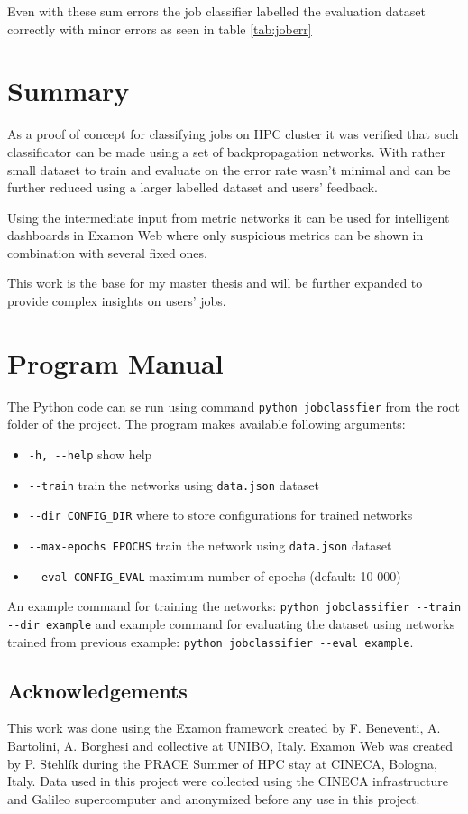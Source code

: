 \documentclass[11pt,a4paper]{article}
\begin{document}
Even with these sum errors the job classifier labelled the evaluation dataset correctly with minor errors as seen in table \ref{tab:joberr}

\section{Summary}
\label{sec:sum}

As a proof of concept for classifying jobs on HPC cluster it was verified that such classificator can be made using a set of backpropagation networks. With rather small dataset to train and evaluate on the error rate wasn't minimal and can be further reduced using a larger labelled dataset and users' feedback.

Using the intermediate input from metric networks it can be used for intelligent dashboards in Examon Web where only suspicious metrics can be shown in combination with several fixed ones.

This work is the base for my master thesis and will be further expanded to provide complex insights on users' jobs.

\section{Program Manual}

The Python code can se run using command \texttt{python jobclassfier} from the root folder of the project. The program makes available following arguments:
\begin{itemize}
    \item \texttt{-h, -{}-help} show help
    \item \texttt{-{}-train} train the networks using \texttt{data.json} dataset
    \item \texttt{-{}-dir CONFIG\_DIR} where to store configurations for trained networks
    \item \texttt{-{}-max-epochs EPOCHS} train the network using \texttt{data.json} dataset
    \item \texttt{-{}-eval CONFIG\_EVAL} maximum number of epochs (default: 10 000)
\end{itemize}

An example command for training the networks: \texttt{python jobclassifier -{}-train -{}-dir example} and example command for evaluating the dataset using networks trained from previous example: \texttt{python jobclassifier -{}-eval example}.


\subsection*{Acknowledgements}
This work was done using the Examon framework created by F. Beneventi, A. Bartolini, A. Borghesi and collective at UNIBO, Italy. Examon Web was created by P. Stehlík during the PRACE Summer of HPC stay at CINECA, Bologna, Italy. Data used in this project were collected using the CINECA infrastructure and Galileo supercomputer and anonymized before any use in this project.

{}

\end{document}
